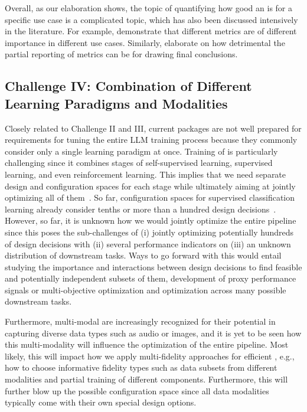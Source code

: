 \documentclass[10pt]{article} %
\begin{document}
Overall, as our elaboration shows, the topic of quantifying how good an \LLM is for a specific use case is a complicated topic, which has also been discussed intensively in the literature. For example, \citet{liang-tmlr23a} demonstrate that different metrics are of different importance in different \LLM use cases. Similarly, \citet{dehghani-iclr22a} elaborate on how detrimental the partial reporting of metrics can be for drawing final conclusions.

\subsection{Challenge IV: Combination of Different Learning Paradigms and Modalities}

Closely related to Challenge II and III, current \AutoML packages are not well prepared for requirements for tuning the entire LLM training process because they commonly consider only a single learning paradigm at once. Training of \LLMs is particularly challenging since it combines stages of self-supervised learning, supervised learning, and even reinforcement learning.
This implies that we need separate design and configuration spaces for each stage while ultimately aiming at jointly optimizing all of them~\citep{hutter-blog22a}. So far, configuration spaces for supervised classification learning already consider tenths or more than a hundred design decisions~\citep{feurer-aaai15a,zimmer-tpami21a,feurer-jmlr22a}. 
However, so far, it is unknown how we would jointly optimize the entire pipeline since this poses the sub-challenges of (i) jointly optimizing potentially hundreds of design decisions with (ii) several performance indicators on (iii) an unknown distribution of downstream tasks. Ways to go forward with this would entail studying the importance and interactions between design decisions to find feasible and potentially independent subsets of them, development of proxy performance signals or multi-objective optimization and optimization across many possible downstream tasks.

Furthermore, multi-modal \LLMs are increasingly recognized for their potential in capturing diverse data types such as audio or images, and it is yet to be seen how this multi-modality will influence the optimization of the entire pipeline. Most likely, this will impact how we apply multi-fidelity approaches for efficient \AutoML, e.g., how to choose informative fidelity types such as data subsets from different modalities and partial training of different components. Furthermore, this will further blow up the possible configuration space since all data modalities typically come with their own special design options. 
\end{document}
